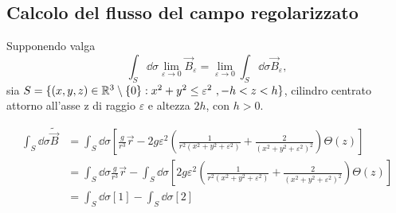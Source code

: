 
\subsection{Calcolo del flusso del campo regolarizzato}
\label{sec:flusso_regolarizzato}
Supponendo valga
$$
  \int_S \dd \sigma \lim_{\varepsilon \to 0} \vec B_\varepsilon
     = \lim_{\varepsilon \to 0} \int_S \dd \sigma \vec B_\varepsilon,
$$
sia $S = \{(x,y,z) \in \mathbb{R}^3 \setminus \{0\} : x^2 + y^2 \leq \varepsilon ^2\ ,-h<z<h\}$,
cilindro centrato attorno all'asse z di raggio $\varepsilon$ e altezza $2h$, con $h>0$.

\begin{equation*}
   \begin{split}
      \int_S \dd \sigma \tilde{\vec B}  &= \int_S \dd \sigma \left[\frac{g}{r^3}\vec r
         - 2g\varepsilon^2 \left( \frac{1}{r^2(x^2 + y^2 + \varepsilon^2)}
               + \frac{2}{(x^2 + y^2 + \varepsilon^2)^2}\right) \Theta(z)  \right] \\
         &= \int_S \dd \sigma \frac{g}{r^3}\vec r
            - \int_S \dd \sigma \left[ 2g\varepsilon^2 \left( \frac{1}{r^2(x^2 + y^2 + \varepsilon^2)}
                  + \frac{2}{(x^2 + y^2 + \varepsilon^2)^2}\right) \Theta(z) \right] \\
          &= \int_S \dd \sigma [1] - \int_S \dd \sigma [2]
   \end{split}
\end{equation*}

